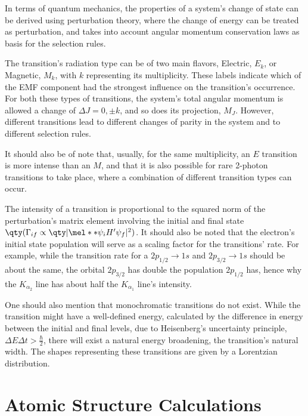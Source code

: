 In terms of quantum mechanics, the properties of a system's change of state can be derived using perturbation theory, where the change of energy can be treated as perturbation, and takes into account angular momentum  conservation laws as basis for the selection rules.

The transition's radiation type can be of two main flavors, Electric, $E_k$, or Magnetic, $M_k$, with $k$ representing its multiplicity. These labels indicate which of the \gls{EMF} component had the strongest influence on the transition's occurrence.
For both these types of transitions, the system's total angular momentum is allowed a change of $\Delta J = 0, \pm k$, and so does its projection, $M_J$. However, different transitions lead to different changes of parity in the system and to different selection rules.

It should also be of note that, usually, for the same multiplicity, an $E$ transition is more intense than an $M$, and that it is also possible for rare 2-photon transitions to take place, where a combination of different transition types can occur.



The intensity of a transition is proportional to the squared norm of the perturbation's matrix element involving the initial and final state $\qty(\Gamma_{if}\propto \qty|\mel**{\psi_i}{H'}{\psi_f}|^2)$. It should also be noted that the electron's initial state population will serve as a scaling factor for the transitions' rate.
For example, while the transition rate for a $2p_{1/2}\rightarrow1s$ and $2p_{3/2}\rightarrow1s$ should be about the same, the orbital $2p_{3/2}$ has double the population $2p_{1/2}$ has, hence why the $K_{\alpha_2}$ line has about half the $K_{\alpha_1}$ line's intensity.

One should also mention that monochromatic transitions do not exist. While the transition might have a well-defined energy, calculated by the difference in energy between the initial and final levels, due to Heisenberg's uncertainty principle, $\Delta E \Delta t > \frac{\hbar}{2}$, there will exist a natural energy broadening, the transition's natural width. The shapes representing these transitions are given by a Lorentzian distribution.




\section{Atomic Structure Calculations}

